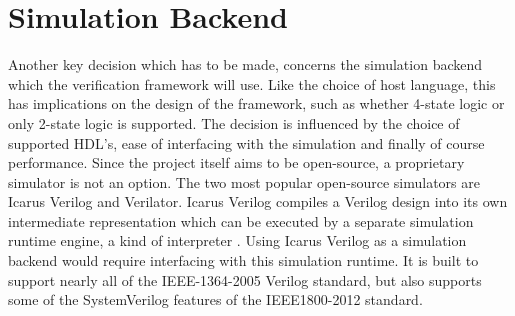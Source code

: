 \documentclass[11pt,a4paper]{report}
\begin{document}

\section{Simulation Backend} %

Another key decision which has to be made, concerns the simulation backend which the verification framework will use.
Like the choice of host language, this has implications on the design of the framework, such as whether 4-state logic
or only 2-state logic is supported.
The decision is influenced by the choice of supported HDL's, ease of interfacing with the simulation and
finally of course performance. Since the project itself aims to be open-source, a proprietary simulator
is not an option. The two most popular open-source simulators are Icarus Verilog and Verilator. Icarus Verilog
compiles a Verilog design into its own intermediate representation which can be executed by a separate simulation
runtime engine, a kind of interpreter \cite{iverilog}. Using Icarus Verilog as a simulation backend would require
interfacing with this simulation runtime. It is built to support nearly all of the IEEE-1364-2005 Verilog standard,
but also supports some of the SystemVerilog features of the IEEE1800-2012 standard.
\end{document}
